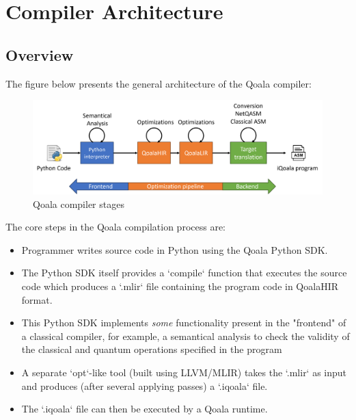 \section{Compiler Architecture}

\subsection{Overview}
The figure below presents the general architecture of the Qoala compiler:

\begin{figure}[ht]
    \centering
    \includegraphics[scale=1.0]{figures/compiler/compiler-arch.png}
    \caption{Qoala compiler stages}
    \label{fig:qoala_compiler_stages}
\end{figure}


The core steps in the Qoala compilation process are:

\begin{itemize}
\item Programmer writes source code in Python using the Qoala Python SDK.
\item The Python SDK itself provides a `compile` function that executes the source code
  which produces a `.mlir` file containing the program code in QoalaHIR format.
\item This Python SDK implements \textit{some} functionality present in the "frontend" of a classical
  compiler, for example, a semantical analysis to check the validity of the classical and
  quantum operations specified in the program 
\item A separate `opt`-like tool (built using LLVM/MLIR) takes the `.mlir` as input and produces
  (after several applying passes) a `.iqoala` file.
\item The `.iqoala` file can then be executed by a Qoala runtime.
\end{itemize}


